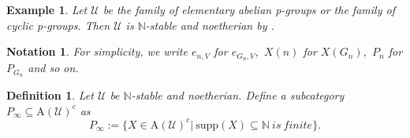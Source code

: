 \documentclass[11pt,a4paper]{amsart}
\numberwithin{equation}{section} \theoremstyle{plain}
\newtheorem{nota}[lem]{Notation}
\newtheorem{definition}[lem]{Definition}
\newtheorem{Ex}[lem]{Example}
\newenvironment{df}{\begin{definition}\rm}{\end{definition}}
\newenvironment{ex}{\begin{Ex}\rm}{\end{Ex}}
\begin{document}
\begin{ex}Let $\mathcal{U}$ be the family of elementary abelian p-groups or the family of cyclic p-groups. Then $\mathcal{U}$ is $\mathbb{N}$-stable and noetherian by \cite[Theorem B]{PS22}.
\end{ex}

\begin{nota}For simplicity, we write $e_{n,V}$ for $e_{G_{n},V}$,~$X(n)$ for $X(G_{n})$,~$P_{n}$ for $P_{G_{n}}$ and so on.
\end{nota}

\begin{df}Let $\mathcal{U}$ be $\mathbb{N}$-stable and noetherian. Define a subcategory $P_{\infty}\subseteq \mathrm{A}(\mathcal{U})^{c}$ as $$P_{\infty}:=\{X\in \mathrm{A}(\mathcal{U})^{c}|~\mathrm{supp}(X)\subseteq\mathbb{N}~is~finite\}.$$
\end{df}
\end{document}
